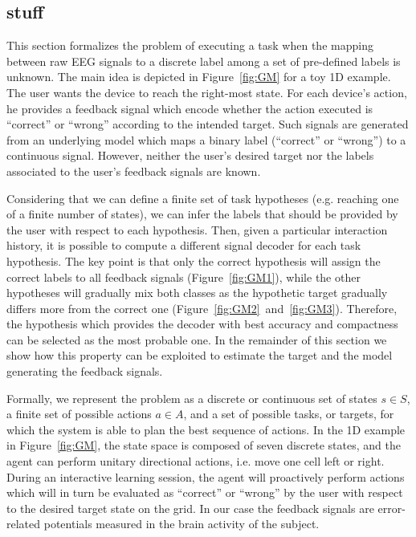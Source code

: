 \subsection{stuff}


This section formalizes the problem of executing a task when the mapping between raw EEG signals to a discrete label among a set of pre-defined labels is unknown. The main idea is depicted in Figure~\ref{fig:GM} for a toy 1D example. The user wants the device to reach the right-most state. For each device's action, he provides a feedback signal which encode whether the action executed is ``correct'' or ``wrong'' according to the intended target. Such signals are generated from an underlying model which maps a binary label (``correct'' or ``wrong'') to a continuous signal. However, neither the user's desired target nor the labels associated to the user's feedback signals are known.

Considering that we can define a finite set of task hypotheses (e.g. reaching one of a finite number of states), we can infer the labels that should be provided by the user with respect to each hypothesis. Then, given a particular interaction history, it is possible to compute a different signal decoder for each task hypothesis. The key point is that only the correct hypothesis will assign the correct labels to all feedback signals (Figure~\ref{fig:GM1}), while the other hypotheses will gradually mix both classes as the hypothetic target gradually differs more from the correct one (Figure~\ref{fig:GM2}~and~\ref{fig:GM3}). Therefore, the hypothesis which provides the decoder with best accuracy and compactness can be selected as the most probable one. In the remainder of this section we show how this property can be exploited to estimate the target and the model generating the feedback signals.

Formally, we represent the problem as a discrete or continuous set of states $s \in S$,  a finite set of possible actions $a \in A$, and a set of possible tasks, or targets, for which the system is able to plan the best sequence of actions. In the 1D example in Figure~\ref{fig:GM}, the state space is composed of seven discrete states, and the agent can perform unitary directional actions, i.e. move one cell left or right. During an interactive learning session, the agent will proactively perform actions which will in turn be evaluated as ``correct'' or ``wrong'' by the user with respect to the desired target state on the grid. In our case the feedback signals are error-related potentials measured in the brain activity of the subject.

